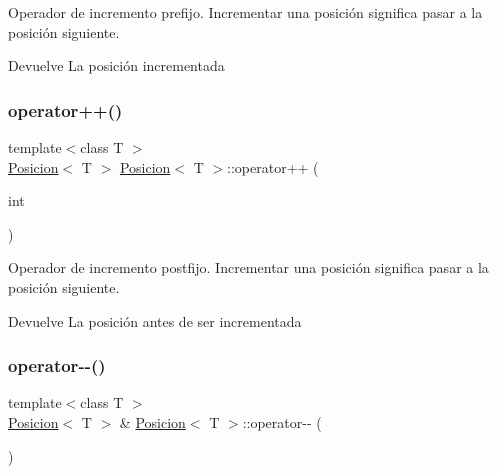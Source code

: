 Operador de incremento prefijo. Incrementar una posición significa pasar a la posición siguiente. 

\begin{DoxyReturn}{Devuelve}
La posición incrementada 
\end{DoxyReturn}
\mbox{\label{classPosicion_a7b4e96a420c4839fe47252fc3dab4999}} 
\subsubsection{\texorpdfstring{operator++()}{operator++()}\hspace{0.1cm}{\footnotesize\ttfamily [2/2]}}
{\footnotesize\ttfamily template$<$class T $>$ \\
\mbox{\hyperlink{classPosicion}{Posicion}}$<$ T $>$ \mbox{\hyperlink{classPosicion}{Posicion}}$<$ T $>$\+::operator++ (\begin{DoxyParamCaption}\item[{int}]{ }\end{DoxyParamCaption})}



Operador de incremento postfijo. Incrementar una posición significa pasar a la posición siguiente. 

\begin{DoxyReturn}{Devuelve}
La posición antes de ser incrementada 
\end{DoxyReturn}
\mbox{\label{classPosicion_a0844ed364ac81dd1a00cb4454e727a45}} 
\subsubsection{\texorpdfstring{operator-\/-\/()}{operator--()}\hspace{0.1cm}{\footnotesize\ttfamily [1/2]}}
{\footnotesize\ttfamily template$<$class T $>$ \\
\mbox{\hyperlink{classPosicion}{Posicion}}$<$ T $>$ \& \mbox{\hyperlink{classPosicion}{Posicion}}$<$ T $>$\+::operator-\/-\/ (\begin{DoxyParamCaption}{ }\end{DoxyParamCaption})}



